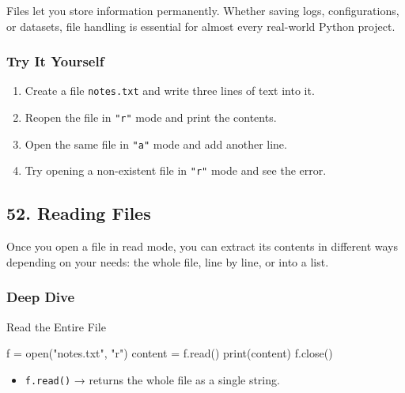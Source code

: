 \documentclass[
  letterpaper,
  DIV=11,
  numbers=noendperiod]{scrreprt}
\newenvironment{Shaded}{\begin{snugshade}}{\end{snugshade}}
\newcommand{\BuiltInTok}[1]{\textcolor[rgb]{0.00,0.23,0.31}{#1}}
\newcommand{\NormalTok}[1]{\textcolor[rgb]{0.00,0.23,0.31}{#1}}
\newcommand{\OperatorTok}[1]{\textcolor[rgb]{0.37,0.37,0.37}{#1}}
\newcommand{\StringTok}[1]{\textcolor[rgb]{0.13,0.47,0.30}{#1}}
\providecommand{\tightlist}{%
  \setlength{\itemsep}{0pt}\setlength{\parskip}{0pt}}
\begin{document}
Files let you store information permanently. Whether saving logs,
configurations, or datasets, file handling is essential for almost every
real-world Python project.

\subsubsection{Try It Yourself}\label{try-it-yourself-50}

\begin{enumerate}
\def\labelenumi{\arabic{enumi}.}
\tightlist
\item
  Create a file \texttt{notes.txt} and write three lines of text into
  it.
\item
  Reopen the file in \texttt{"r"} mode and print the contents.
\item
  Open the same file in \texttt{"a"} mode and add another line.
\item
  Try opening a non-existent file in \texttt{"r"} mode and see the
  error.
\end{enumerate}

\subsection{52. Reading Files}\label{reading-files}

Once you open a file in read mode, you can extract its contents in
different ways depending on your needs: the whole file, line by line, or
into a list.

\subsubsection{Deep Dive}\label{deep-dive-51}

Read the Entire File

\begin{Shaded}
\begin{Highlighting}[]
\NormalTok{f }\OperatorTok{=} \BuiltInTok{open}\NormalTok{(}\StringTok{"notes.txt"}\NormalTok{, }\StringTok{"r"}\NormalTok{)}
\NormalTok{content }\OperatorTok{=}\NormalTok{ f.read()}
\BuiltInTok{print}\NormalTok{(content)}
\NormalTok{f.close()}
\end{Highlighting}
\end{Shaded}

\begin{itemize}
\tightlist
\item
  \texttt{f.read()} → returns the whole file as a single string.
\end{itemize}
\end{document}
